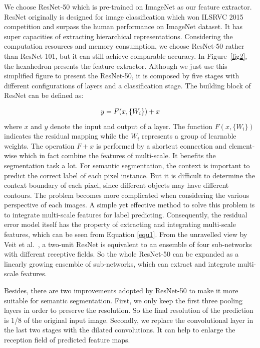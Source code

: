 \documentclass[10.5pt,compsoc]{TsT}
\newcommand{\upcite}[1]{\superscript{\textsuperscript{\cite{#1}}}}
\theoremstyle{mystyle}
\newcommand{\upcite}[1]{\textsuperscript{\cite{#1}}}
\begin{document}
{We choose ResNet-50 which is pre-trained on ImageNet as our feature extractor. ResNet originally is designed for image classification which won ILSRVC 2015 competition and surpass the human performance on ImageNet dataset. It has super capacities of extracting hierarchical representations. Considering the computation resources and memory consumption, we choose ResNet-50 rather than ResNet-101, but it can still achieve comparable accuracy. In Figure~\ref{fig2}, the hexahedron presents the feature extractor. Although we just use this simplified figure to present the ResNet-50, it is composed by five stages with different configurations of layers and a classification stage. The building block of ResNet can be defined as:

\begin{equation}\label{equ1}
\setlength\abovedisplayskip{4pt}
\setlength\belowdisplayskip{4pt}
\begin{split}
y = F(x, \{W_{i}\}) + x \\
\end{split}
\end{equation} 
where $x$ and $y$ denote the input and output of a layer. The function $F(x, \{W_{i}\})$ indicates the residual mapping while the $W_{i}$ represents a group of learnable weights. The operation $F + x$ is performed by a shortcut connection and element-wise which in fact combine the features of multi-scale. It benefits the segmentation task a lot. For semantic segmentation,  the context is important to predict the correct label of each pixel instance. But it is difficult to determine the context boundary of each pixel, since different objects may have different contours. The problem becomes more complicated when considering the various perspective of each images. A simple yet effective method to solve this problem is to integrate multi-scale features for label predicting. Consequently, the residual error model itself has the property of extracting and integrating multi-scale features, which can be seen from Equation \ref {equ1}. From the unravelled view by Veit et al.~\upcite{22}, a two-unit ResNet is equivalent to an ensemble of four sub-networks with different receptive fields. So the whole ResNet-50 can be expanded as a linearly growing ensemble of sub-networks, which can extract and integrate multi-scale features.

Besides, there are two improvements adopted by ResNet-50 to make it more suitable for semantic segmentation. First, we only keep the first three pooling layers in order to preserve the resolution. So the final resolution of the prediction is 1/8 of the original input image. Secondly, we replace the convolutional layer in the last two stages with the dilated convolutions. It can help to enlarge the reception field of predicted feature maps.



}
\end{document}
